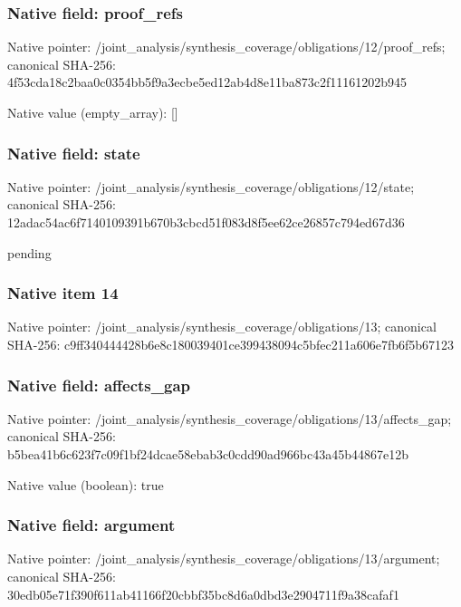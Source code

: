 \documentclass[10pt,a4paper]{article}
\begin{document}
\subsubsection{Native field: proof\_\allowbreak{}refs}
Native pointer: /joint\_\allowbreak{}analysis/synthesis\_\allowbreak{}coverage/obligations/12/proof\_\allowbreak{}refs; canonical SHA-256: 4f53cda18c2baa0c0354bb5f9a3ecbe5ed12ab4d8e11ba873c2f11161202b945

Native value (empty\_\allowbreak{}array): []

\subsubsection{Native field: state}
Native pointer: /joint\_\allowbreak{}analysis/synthesis\_\allowbreak{}coverage/obligations/12/state; canonical SHA-256: 12adac54ac6f7140109391b670b3cbcd51f083d8f5ee62ce26857c794ed67d36

\begingroup\raggedright\sloppy pending\par\endgroup

\subsubsection{Native item 14}
Native pointer: /joint\_\allowbreak{}analysis/synthesis\_\allowbreak{}coverage/obligations/13; canonical SHA-256: c9ff340444428b6e8c180039401ce399438094c5bfec211a606e7fb6f5b67123

\subsubsection{Native field: affects\_\allowbreak{}gap}
Native pointer: /joint\_\allowbreak{}analysis/synthesis\_\allowbreak{}coverage/obligations/13/affects\_\allowbreak{}gap; canonical SHA-256: b5bea41b6c623f7c09f1bf24dcae58ebab3c0cdd90ad966bc43a45b44867e12b

Native value (boolean): true

\subsubsection{Native field: argument}
Native pointer: /joint\_\allowbreak{}analysis/synthesis\_\allowbreak{}coverage/obligations/13/argument; canonical SHA-256: 30edb05e71f390f611ab41166f20cbbf35bc8d6a0dbd3e2904711f9a38cafaf1
\end{document}
